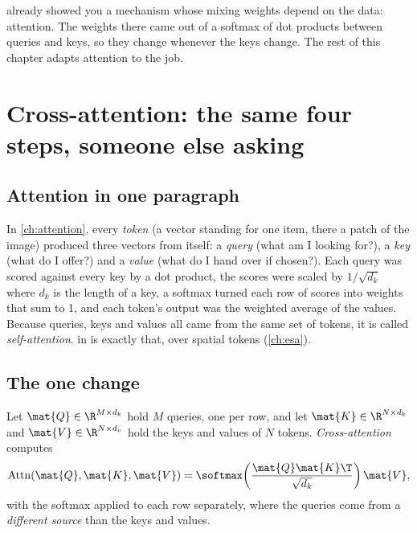  already showed you a mechanism whose mixing weights depend on the data: attention. The weights there came out of a softmax of dot products between queries and keys, so they change whenever the keys change. The rest of this chapter adapts attention to the job.

\section{Cross-attention: the same four steps, someone else asking}\label{sec:ceiling:cross}

\subsection{Attention in one paragraph}

In \cref{ch:attention}, every \emph{token} (a vector standing for one item, there a patch of the image) produced three vectors from itself: a \emph{query} (what am I looking for?), a \emph{key} (what do I offer?) and a \emph{value} (what do I hand over if chosen?). Each query was scored against every key by a dot product, the scores were scaled by $1/\sqrt{d_k}$ where $d_k$ is the length of a key, a softmax turned each row of scores into weights that sum to 1, and each token's output was the weighted average of the values. Because queries, keys and values all came from the same set of tokens, it is called \emph{self-attention}.  in  is exactly that, over spatial tokens (\cref{ch:esa}).

\subsection{The one change}

\begin{definition}
Let $\mat{Q}\in\R^{M\times d_k}$ hold $M$ queries, one per row, and let $\mat{K}\in\R^{N\times d_k}$ and $\mat{V}\in\R^{N\times d_v}$ hold the keys and values of $N$ tokens. \emph{Cross-attention} computes
\begin{equation}\label{eq:ceiling:xattn}
  \operatorname{Attn}(\mat{Q},\mat{K},\mat{V}) = \softmax\!\left(\frac{\mat{Q}\mat{K}\T}{\sqrt{d_k}}\right)\mat{V},
\end{equation}
with the softmax applied to each row separately, where the queries come from a \emph{different source} than the keys and values.
\end{definition}

